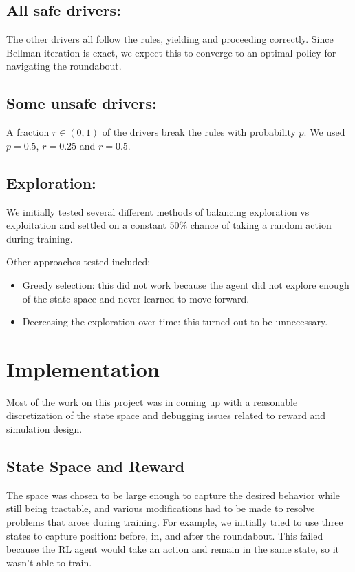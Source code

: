 \documentclass[conference]{IEEEtran}
\begin{document}
\subsection*{All safe drivers:} The other drivers all follow the rules, yielding and proceeding correctly. Since Bellman iteration is exact, we expect this to converge to an optimal policy for navigating the roundabout.

\subsection*{Some unsafe drivers:} A fraction $r\in (0,1)$ of the drivers break the rules with probability $p$. We used $p=0.5$, $r=0.25$ and $r=0.5$.

\subsection*{Exploration:} We initially tested several different methods of balancing exploration vs exploitation and settled on a constant 50\% chance of taking a random action during training.

Other approaches tested included:
\begin{itemize}
	\item Greedy selection: this did not work because the agent did not explore enough of the state space and never learned to move forward.
	\item Decreasing the exploration over time: this turned out to be unnecessary.
\end{itemize}

\section{Implementation} Most of the work on this project was in coming up with a reasonable discretization of the state space and debugging issues related to reward and simulation design.

\subsection*{State Space and Reward} The space was chosen to be large enough to capture the desired behavior while still being tractable, and various modifications had to be made to resolve problems that arose during training.
For example, we initially tried to use three states to capture position: before, in, and after the roundabout. This failed because the RL agent would take an action and remain in the same state, so it wasn't able to train.
\end{document}
